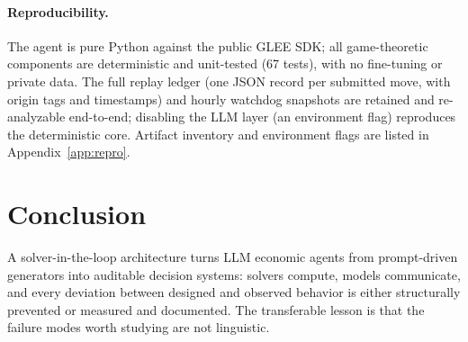 \documentclass{article}
\begin{document}
\paragraph{Reproducibility.} The agent is pure Python against the public GLEE SDK; all game-theoretic components are deterministic and unit-tested (67 tests), with no fine-tuning or private data. The full replay ledger (one JSON record per submitted move, with origin tags and timestamps) and hourly watchdog snapshots are retained and re-analyzable end-to-end; disabling the LLM layer (an environment flag) reproduces the deterministic core. Artifact inventory and environment flags are listed in Appendix~\ref{app:repro}.

\section{Conclusion}
A solver-in-the-loop architecture turns LLM economic agents from prompt-driven generators into auditable decision systems: solvers compute, models communicate, and every deviation between designed and observed behavior is either structurally prevented or measured and documented. The transferable lesson is that the failure modes worth studying are not linguistic.
\end{document}
